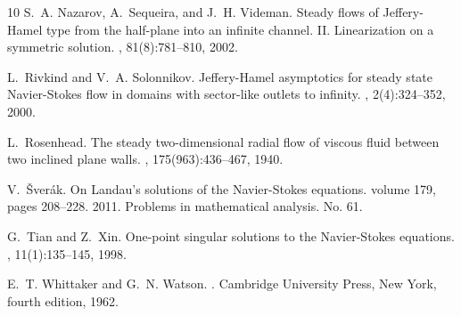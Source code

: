 \documentclass[reqno,12pt]{amsart}
\begin{document}
\begin{thebibliography}{10}
	S.~A. Nazarov, A.~Sequeira, and J.~H. Videman.
	\newblock Steady flows of {J}effery-{H}amel type from the half-plane into an
	infinite channel. {II}. {L}inearization on a symmetric solution.
	, 81(8):781--810, 2002.
	
	L.~Rivkind and V.~A. Solonnikov.
	\newblock Jeffery-{H}amel asymptotics for steady state {N}avier-{S}tokes flow
	in domains with sector-like outlets to infinity.
	, 2(4):324--352, 2000.
	
	L.~Rosenhead.
	\newblock The steady two-dimensional radial flow of viscous fluid between two
	inclined plane walls.
	, 175(963):436--467, 1940.
	
	V.~\v{S}ver\'{a}k.
	\newblock On {L}andau's solutions of the {N}avier-{S}tokes equations.
	\newblock volume 179, pages 208--228. 2011.
	\newblock Problems in mathematical analysis. No. 61.
	
	G.~Tian and Z.~Xin.
	\newblock One-point singular solutions to the {N}avier-{S}tokes equations.
	, 11(1):135--145, 1998.
	
	E.~T. Whittaker and G.~N. Watson.
	.
	\newblock Cambridge University Press, New York, fourth edition, 1962.
	
\end{thebibliography}
\end{document}

